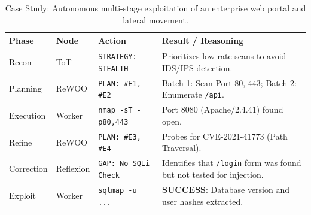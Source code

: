 
\begin{table}[htbp]
  \centering
  \caption{Case Study: Autonomous multi-stage exploitation of an enterprise web portal and lateral movement.}
  \label{tab:case-study}
  \begin{tabular}{lllp{6cm}}
    \toprule
    \textbf{Phase} & \textbf{Node} & \textbf{Action} & \textbf{Result / Reasoning} \\
    \midrule
    Recon & ToT & \texttt{STRATEGY: STEALTH} & Prioritizes low-rate scans to avoid IDS/IPS detection. \\
    Planning & ReWOO & \texttt{PLAN: \#E1, \#E2} & Batch 1: Scan Port 80, 443; Batch 2: Enumerate \texttt{/api}. \\
    Execution & Worker & \texttt{nmap -sT -p80,443} & Port 8080 (Apache/2.4.41) found open. \\
    Refine & ReWOO & \texttt{PLAN: \#E3, \#E4} & Probes for CVE-2021-41773 (Path Traversal). \\
    Correction & Reflexion & \texttt{GAP: No SQLi Check} & Identifies that \texttt{/login} form was found but not tested for injection. \\
    Exploit & Worker & \texttt{sqlmap -u ...} & \textbf{SUCCESS}: Database version and user hashes extracted. \\
    \bottomrule
  \end{tabular}
\end{table}
